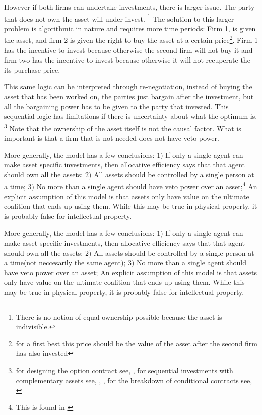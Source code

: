 \documentclass[12pt]{article}
\numberwithin{equation}{section}
\begin{document}

However if both firms can undertake investments, there is larger issue. The party that does not own the asset will under-invest. \footnote{There is no notion of equal ownership possible because the asset is indivisible.}  The solution to this larger problem is algorithmic in nature and requires more time periods: Firm 1, is given the asset, and firm 2 is given the right to buy the asset at a certain price\footnote{for a first best this price should be the value of the asset after the second firm has also invested}. Firm 1 has the incentive to invest because otherwise the second firm will not buy it and firm two has the incentive to invest because otherwise it will not recuperate the its purchase price.

This same logic can be interpreted through re-negotiation, instead of buying the asset that has been worked on, the parties just bargain after the investment, but all the bargaining power has to be given to the party that invested. This sequential logic has limitations if there is uncertainty about what the optimum is. \footnote{for designing the option contract see, \cite{Noldeke1998}, for sequential investments with complementary assets see, \cite{Zhang2014},\cite{bessen_maskin} , for the breakdown of conditional contracts see, \cite{Maskin1999}} Note that the ownership of the asset itself is not the causal factor. What is important is that a firm that is not needed does not have veto power.

More generally, the model has a few conclusions: $1)$ If only a single agent can make asset specific investments, then allocative efficiency says that that agent should own all the assets; $2)$ All assets should be controlled by a single person at a time; $3)$ No more than a single agent should have veto power over an asset;\footnote{This is found in \cite{Hart1990}} An explicit assumption of this model is that assets only have value on the ultimate coalition that ends up using them. While this may be true in physical property, it is probably false for intellectual property.

More generally, the model has a few conclusions: $1)$ If only a single agent can make asset specific investments, then allocative efficiency says that that agent should own all the assets; $2)$ All assets should be controlled by a single person at a time(not neccesarily the same agent); $3)$ No more than a single agent should have veto power over an asset; An explicit assumption of this model is that assets only have value on the ultimate coalition that ends up using them. While this may be true in physical property, it is probably false for intellectual property.
\end{document}
